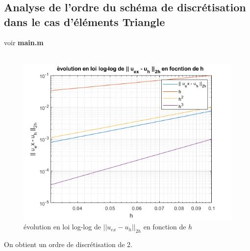 \documentclass{article}
\begin{document}
\subsection{Analyse de l'ordre du schéma de discrétisation dans le cas d'éléments Triangle}

voir \textbf{main.m} \\ \\ 

\begin{figure}[H]
\centering
\includegraphics[width=12cm]{loglog.png}
\caption{évolution en loi log-log de $|| u_{ex} - u_h ||_{2h}$ en fonction de $h$}
\end{figure}
On obtient un ordre de discrétisation de 2.
\end{document}
